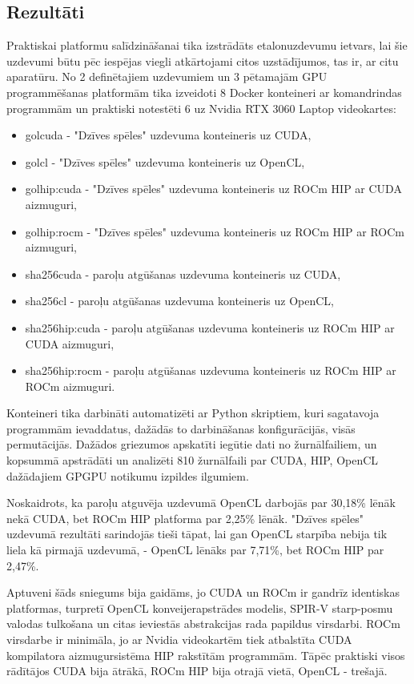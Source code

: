 \begin{center}
    \chapter{Rezultāti}
\end{center}

Praktiskai platformu salīdzināšanai tika izstrādāts etalonuzdevumu ietvars, 
lai šie uzdevumi būtu pēc iespējas viegli atkārtojami citos uzstādījumos, tas
ir, ar citu aparatūru. No 2 definētajiem uzdevumiem un 3 pētamajām GPU
programmēšanas platformām tika izveidoti 8 Docker konteineri ar komandrindas
programmām un praktiski notestēti 6 uz Nvidia RTX 3060 Laptop videokartes:
\begin{itemize}
    \setlength\itemsep{0pt}
    \item golcuda - "Dzīves spēles" uzdevuma konteineris uz CUDA,
    \item golcl - "Dzīves spēles" uzdevuma konteineris uz OpenCL,
    \item golhip:cuda - "Dzīves spēles" uzdevuma konteineris uz ROCm HIP ar CUDA aizmuguri,
    \item golhip:rocm - "Dzīves spēles" uzdevuma konteineris uz ROCm HIP ar ROCm aizmuguri,
    \item sha256cuda - paroļu atgūšanas uzdevuma konteineris uz CUDA,
    \item sha256cl - paroļu atgūšanas uzdevuma konteineris uz OpenCL,
    \item sha256hip:cuda - paroļu atgūšanas uzdevuma konteineris uz ROCm HIP ar CUDA aizmuguri,
    \item sha256hip:rocm - paroļu atgūšanas uzdevuma konteineris uz ROCm HIP ar ROCm aizmuguri.
\end{itemize}

Konteineri tika darbināti automatizēti ar Python skriptiem, kuri sagatavoja
programmām ievaddatus, dažādās to darbināšanas konfigurācijās, visās
permutācijās. Dažādos griezumos apskatīti iegūtie dati no žurnālfailiem, un
kopsummā apstrādāti un analizēti 810 žurnālfaili par CUDA, HIP, OpenCL
dažādajiem GPGPU notikumu izpildes ilgumiem.

Noskaidrots, ka paroļu atguvēja uzdevumā OpenCL darbojās par 30,18\% lēnāk nekā
CUDA, bet ROCm HIP platforma par 2,25\% lēnāk. "Dzīves spēles" uzdevumā
rezultāti sarindojās tieši tāpat, lai gan OpenCL starpība nebija tik liela kā
pirmajā uzdevumā, - OpenCL lēnāks par 7,71\%, bet ROCm HIP par 2,47\%.

Aptuveni šāds sniegums bija gaidāms, jo CUDA un ROCm ir gandrīz identiskas
platformas, turpretī OpenCL konveijerapstrādes modelis, SPIR-V starp-posmu
valodas tulkošana un citas ieviestās abstrakcijas rada papildus virsdarbi. ROCm
virsdarbe ir minimāla, jo ar Nvidia videokartēm tiek atbalstīta CUDA
kompilatora aizmugursistēma HIP rakstītām programmām. Tāpēc praktiski
visos rādītājos CUDA bija ātrākā, ROCm HIP bija otrajā vietā, OpenCL - trešajā.

